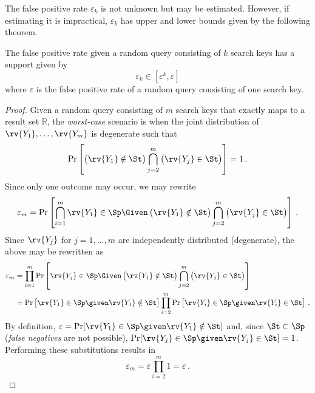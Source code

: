 \documentclass[ ../main.tex]{subfiles}
\begin{document}
The false positive rate $\varepsilon_k$ is not unknown but may be estimated. However, if estimating it is impractical, $\varepsilon_k$ has upper and lower bounds given by the following theorem.
\begin{theorem}
The false positive rate given a random query consisting of $k$ search keys has a support given by
\begin{equation}
    \varepsilon_k \in [\varepsilon^k, \varepsilon]
\end{equation}
where $\varepsilon$ is the false positive rate of a random query consisting of one search key.
\end{theorem}
\begin{proof}
Given a random query consisting of $m$ search keys that exactly maps to a result set $\mathbb{R}$, the \emph{worst-case} scenario is when the joint distribution of $\rv{Y_1}, \ldots, \rv{Y_m}$ is degenerate such that
\begin{equation}
    \Pr\left[\left(\rv{Y_1} \notin \St\right) \bigcap_{j=2}^{m} \left(\rv{Y_j} \in \St\right)\right] = 1\,.
\end{equation}
Since only one outcome may occur, we may rewrite 
\begin{equation}
    \varepsilon_m =
        \Pr\left[\bigcap_{i=1}^{m} \rv{Y_1} \in \Sp \Given \left(\rv{Y_1} \notin \St\right) \bigcap_{j=2}^{m} \left(\rv{Y_j} \in \St\right)\right]\,.
\end{equation}
Since $\rv{Y_j}$ for $j=1,\ldots,m$ are independently distributed (degenerate), the above may be rewritten as
\begin{align}
    \varepsilon_m
        &= \prod_{i=1}^{m} \Pr\left[\rv{Y_j} \in \Sp \Given \left(\rv{Y_1} \notin \St\right) \bigcap_{j=2}^{m} \left(\rv{Y_j} \in \St\right)\right]\\
        &= \Pr\left[\rv{Y_1} \in \Sp \given \rv{Y_1} \notin \St\right] \prod_{i=2}^{m} \Pr\left[\rv{Y_i} \in \Sp \given \rv{Y_i} \in \St\right]\,.
\end{align}
By definition, $\varepsilon = \Pr[\rv{Y_1} \in \Sp \given \rv{Y_1} \notin \St]$ and, since $\St \subset \Sp$ (\emph{false negatives} are not possible), $\Pr[\rv{Y_j} \in \Sp \given \rv{Y_j} \in \St] = 1$. Performing these substitutions results in
\begin{equation}
\label{eq:proof_fprate_hq_lb}
    \varepsilon_m = \varepsilon \prod_{i=2}^{m} 1 = \varepsilon\,.
\end{equation}


\end{proof}
\end{document}
